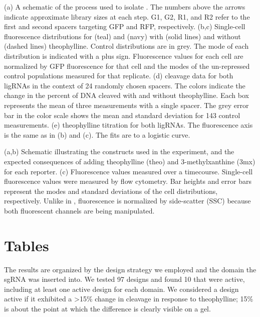 \documentclass[10pt,oneside]{article}
\begin{document}


 (a) A schematic of the process used to isolate \ligrnaF{}.  The numbers above the arrows indicate approximate library sizes at each step.  G1, G2, R1, and R2 refer to the first and second spacers targeting GFP and RFP, respectively.
 (b,c) Single-cell fluorescence distributions for \ligrnaF{} (teal) and \ligrnaB{} (navy) with (solid lines) and without (dashed lines) theophylline.  Control distributions are in grey.  The mode of each distribution is indicated with a plus sign.  Fluorescence values for each cell are normalized by GFP fluorescence for that cell and the modes of the un-repressed control populations measured for that replicate.
 (d) \Invitro{} cleavage data for both ligRNAs in the context of 24 randomly chosen spacers.  The colors indicate the change in the percent of DNA cleaved with and without theophylline.  Each box represents the mean of three measurements with a single spacer.   The grey error bar in the color scale shows the mean and standard deviation for 143 control measurements.
 (e) \Invivo{} theophylline titration for both ligRNAs.  The fluorescence axis is the same as in (b) and (c).  The fits are to a logistic curve.
 



 (a,b) Schematic illustrating the constructs used in the experiment, and the expected consequences of adding theophylline (theo) and 3-methylxanthine (3mx) for each reporter.
 (c) Fluorescence values measured over a  timecourse.  Single-cell fluorescence values were measured by flow cytometry.  Bar heights and error bars represent the modes and standard deviations of the cell distributions, respectively.  Unlike in , fluorescence is normalized by side-scatter (SSC) because both fluorescent channels are being manipulated.

\section{Tables}



   The results are organized by the design strategy we employed and the domain the sgRNA was inserted into.  We tested 97 designs and found 10 that were active, including at least one active design for each domain.  We considered a design active if it exhibited a >15\% change in cleavage in response to theophylline; 15\% is about the point at which the difference is clearly visible on a gel.
\end{document}
